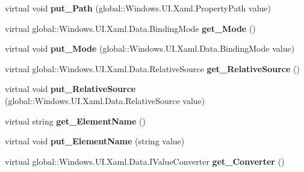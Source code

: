 \begin{DoxyCompactItemize}
virtual void {\bfseries put\+\_\+\+Path} (global\+::\+Windows.\+U\+I.\+Xaml.\+Property\+Path value)
\item 
\mbox{\label{class_windows_1_1_u_i_1_1_xaml_1_1_data_1_1_binding_ab0c392cb49f178e29a63d12a683e2c4f}} 
virtual global\+::\+Windows.\+U\+I.\+Xaml.\+Data.\+Binding\+Mode {\bfseries get\+\_\+\+Mode} ()
\item 
\mbox{\label{class_windows_1_1_u_i_1_1_xaml_1_1_data_1_1_binding_abc7d75756c9f93a8ec488cecb97265c5}} 
virtual void {\bfseries put\+\_\+\+Mode} (global\+::\+Windows.\+U\+I.\+Xaml.\+Data.\+Binding\+Mode value)
\item 
\mbox{\label{class_windows_1_1_u_i_1_1_xaml_1_1_data_1_1_binding_ac23f4899bbf0de1eaba1d8fc24e9f7c3}} 
virtual global\+::\+Windows.\+U\+I.\+Xaml.\+Data.\+Relative\+Source {\bfseries get\+\_\+\+Relative\+Source} ()
\item 
\mbox{\label{class_windows_1_1_u_i_1_1_xaml_1_1_data_1_1_binding_a9e13fc7038d328684876c114c0262cd2}} 
virtual void {\bfseries put\+\_\+\+Relative\+Source} (global\+::\+Windows.\+U\+I.\+Xaml.\+Data.\+Relative\+Source value)
\item 
\mbox{\label{class_windows_1_1_u_i_1_1_xaml_1_1_data_1_1_binding_a93680aa9f018dd4f75ac7515c0a00ebf}} 
virtual string {\bfseries get\+\_\+\+Element\+Name} ()
\item 
\mbox{\label{class_windows_1_1_u_i_1_1_xaml_1_1_data_1_1_binding_aabd010dd96a55bf922196a78fe1ad2ed}} 
virtual void {\bfseries put\+\_\+\+Element\+Name} (string value)
\item 
\mbox{\label{class_windows_1_1_u_i_1_1_xaml_1_1_data_1_1_binding_a75056d5c72401518166caead820596d9}} 
virtual global\+::\+Windows.\+U\+I.\+Xaml.\+Data.\+I\+Value\+Converter {\bfseries get\+\_\+\+Converter} ()
\item 
\mbox{\label{class_windows_1_1_u_i_1_1_xaml_1_1_data_1_1_binding_a5721074cd9c3ec7e50bd6d5b645234e7}} 

\end{DoxyCompactItemize}
